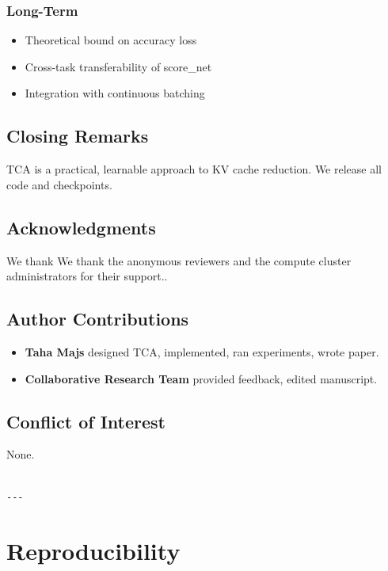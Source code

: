 \subsubsection{Long-Term}
\begin{itemize}
\item Theoretical bound on accuracy loss
\item Cross-task transferability of score\_net
\item Integration with continuous batching

\end{itemize}
\subsection{Closing Remarks}

TCA is a practical, learnable approach to KV cache reduction. We release all 
code and checkpoints.

\subsection{Acknowledgments}

We thank We thank the anonymous reviewers and the compute cluster administrators for their support..

\subsection{Author Contributions}

\begin{itemize}
\item \textbf{Taha Majs} designed TCA, implemented, ran experiments, wrote paper.
\item \textbf{Collaborative Research Team} provided feedback, edited manuscript.

\end{itemize}
\subsection{Conflict of Interest}

None.
\begin{lstlisting}

---
\end{lstlisting}

\section{Reproducibility}

